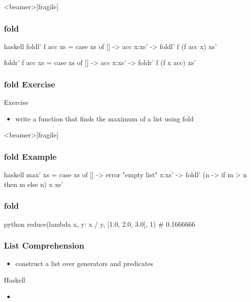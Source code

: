 \documentclass[dvipsnames]{beamer}
\theoremstyle{plain}
\begin{document}
\begin{frame}<beamer>[fragile]
  \frametitle{fold}

  \begin{example}[Haskell]
    \begin{pygments}{haskell}
foldl' f acc xs =
    case xs of
      [] -> acc
      x:xs' -> foldl' f (f acc x) xs'

foldr' f acc xs =
    case xs of
      [] -> acc
      x:xs' -> foldr' f (f x acc) xs'
    \end{pygments}
  \end{example}
\end{frame}

\begin{frame}[fragile]
  \frametitle{fold Exercise}

  \begin{block}{Exercise}
    \begin{itemize}
      \item write a function that finds the maximum of a list using fold
    \end{itemize}
  \end{block}
\end{frame}

\begin{frame}<beamer>[fragile]
  \frametitle{fold Example}

  \begin{example}
    \begin{pygments}{haskell}
max' xs =
    case xs of
      [] -> error "empty list"
      x:xs' -> foldl' (\m n -> if m > n then m else n) x xs'
    \end{pygments}
  \end{example}
\end{frame}

\begin{frame}[fragile]
  \frametitle{fold}

  \begin{example}[Python]
    \begin{pygments}{python}
reduce(lambda x, y: x / y,
       [1.0, 2.0, 3.0], 1)      # 0.1666666
    \end{pygments}
  \end{example}
\end{frame}

\begin{frame}[fragile]
  \frametitle{List Comprehension}

  \begin{itemize}
    \item construct a list over generators and predicates
  \end{itemize}

  \pause
  \begin{block}{Haskell}
    \begin{itemize}
      \item {}
    \end{itemize}
  \end{block}
\end{frame}
\end{document}

